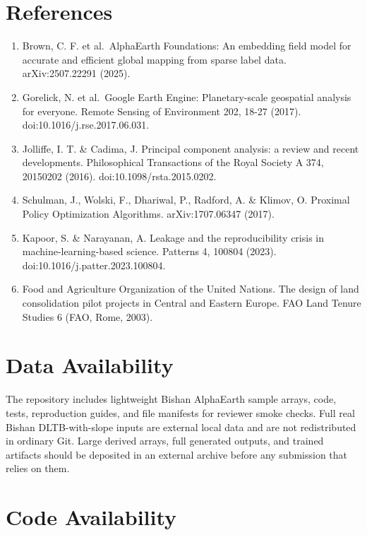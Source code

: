 \documentclass[
  11pt,
  a4paper,
]{article}
\providecommand{\tightlist}{%
  \setlength{\itemsep}{0pt}\setlength{\parskip}{0pt}}
\begin{document}
\section{References}\label{references}

\begin{enumerate}
\def\labelenumi{\arabic{enumi}.}
\tightlist
\item
  Brown, C. F. et al.~AlphaEarth Foundations: An embedding field model
  for accurate and efficient global mapping from sparse label data.
  arXiv:2507.22291 (2025).
\item
  Gorelick, N. et al.~Google Earth Engine: Planetary-scale geospatial
  analysis for everyone. Remote Sensing of Environment 202, 18-27
  (2017). doi:10.1016/j.rse.2017.06.031.
\item
  Jolliffe, I. T. \& Cadima, J. Principal component analysis: a review
  and recent developments. Philosophical Transactions of the Royal
  Society A 374, 20150202 (2016). doi:10.1098/rsta.2015.0202.
\item
  Schulman, J., Wolski, F., Dhariwal, P., Radford, A. \& Klimov, O.
  Proximal Policy Optimization Algorithms. arXiv:1707.06347 (2017).
\item
  Kapoor, S. \& Narayanan, A. Leakage and the reproducibility crisis in
  machine-learning-based science. Patterns 4, 100804 (2023).
  doi:10.1016/j.patter.2023.100804.
\item
  Food and Agriculture Organization of the United Nations. The design of
  land consolidation pilot projects in Central and Eastern Europe. FAO
  Land Tenure Studies 6 (FAO, Rome, 2003).
\end{enumerate}

\section{Data Availability}\label{data-availability}

The repository includes lightweight Bishan AlphaEarth sample arrays,
code, tests, reproduction guides, and file manifests for reviewer smoke
checks. Full real Bishan DLTB-with-slope inputs are external local data
and are not redistributed in ordinary Git. Large derived arrays, full
generated outputs, and trained artifacts should be deposited in an
external archive before any submission that relies on them.

\section{Code Availability}\label{code-availability}
\end{document}

